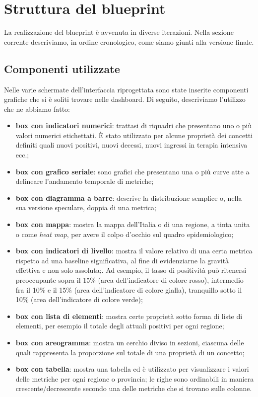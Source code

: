 \section{Struttura del blueprint}\label{s:struttura-blueprint}
La realizzazione del blueprint è avvenuta in diverse iterazioni. Nella sezione corrente descriviamo, in ordine cronologico, come siamo giunti alla versione finale.

\subsection{Componenti utilizzate}\label{ss:componenti-utilizzate}
Nelle varie schermate dell'interfaccia riprogettata sono state inserite componenti grafiche che si è soliti trovare nelle dashboard. Di seguito, descriviamo l'utilizzo che ne abbiamo fatto:
\begin{itemize}
    \item \textbf{box con indicatori numerici}: trattasi di riquadri che presentano uno o più valori numerici etichettati. È stato utilizzato per alcune proprietà dei concetti definiti quali nuovi positivi, nuovi decessi, nuovi ingressi in terapia intensiva ecc.;
    \item \textbf{box con grafico seriale}: sono grafici che presentano una o più curve atte a delineare l'andamento temporale di metriche;
    \item \textbf{box con diagramma a barre}: descrive la distribuzione semplice o, nella sua versione speculare, doppia di una metrica;
    \item \textbf{box con mappa}: mostra la mappa dell'Italia o di una regione, a tinta unita o come \textit{heat map}, per avere il colpo d'occhio sul quadro epidemiologico;
    \item \textbf{box con indicatori di livello}: mostra il valore relativo di una certa metrica rispetto ad una baseline significativa, al fine di evidenziarne la gravità effettiva e non solo assoluta;. Ad esempio, il tasso di positività può ritenersi preoccupante sopra il 15\% (area dell'indicatore di colore rosso), intermedio fra il 10\% e il 15\% (area dell'indicatore di colore gialla), tranquillo sotto il 10\% (area dell'indicatore di colore verde);
    \item \textbf{box con lista di elementi}: mostra certe proprietà sotto forma di liste di elementi, per esempio il totale degli attuali positivi per ogni regione;
    \item \textbf{box con areogramma}: mostra un cerchio diviso in sezioni, ciascuna delle quali rappresenta la proporzione sul totale di una proprietà di un concetto;
    \item \textbf{box con tabella}: mostra una tabella ed è utilizzato per visualizzare i valori delle metriche per ogni regione o provincia; le righe sono ordinabili in maniera crescente/decrescente secondo una delle metriche che si trovano sulle colonne.
\end{itemize}

